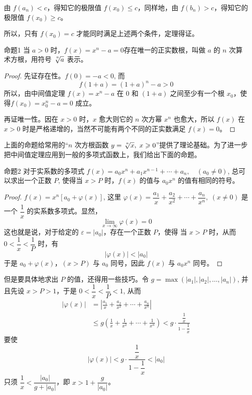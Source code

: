 由 $f(a_n)<c$，得知它的极限值 $f(x_0)\leqslant c$，同样地，由 $f(b_n)>c$，得知它的极限值 $f(x_0)\geqslant c$。

所以，只有 $f(x_0)=c$ 才能同时满足上述两个条件，定理得证。

\begin{Theorem}{命题1}
  当 $a>0$ 时，$f(x)=x^n-a=0$存在唯一的正实数根，叫做 $a$ 的 $n$ 次算术方根，用符号 $\sqrt[\uproot{3}\leftroot{-1}n]{a}$ 表示。
\end{Theorem}

\begin{proof}
先证存在性。$f(0)=-a<0$, 而
\[f(1+a)=(1+a)^n-a>0\]
所以，由中间值定理 $f(x)=x^n-a$ 在 0 和 $(1+a)$ 之间至少有一个根 $x_0$，使得$f(x_0)=x_0^n-a=0$ 成立。

再证唯一性。因在 $x>0$ 时，$x$ 愈大则它的 $n$ 次方幂 $x^n$ 也愈大，所以 $f(x)$ 在 $x>0$ 时是严格递增的，当然不可能有两个不同的正实数满足 $f(x)=0$。
\end{proof}

上面的命题给常用的“$n$ 次方根函数 $y=\sqrt[\uproot{3}\leftroot{-1}n]{x},\; x\geqslant 0$”提供了理论基础。为了进一步把中间值定理应用到一般的多项式函数上，我们给出下面的命题。

\begin{Theorem}{命题2 }
对于实系数的多项式
$f(x)=a_0x^n+a_1x^{n-1}+\cdots+a_n,\quad (a_0\ne 0)$, 总可以求出一个正数 $P$, 使得当 $x>P$ 时，$f(x)$ 的值与 $a_0x^n$ 的值有相同的符号。
\end{Theorem}

\begin{proof}
$f(x)=x^n[a_0+\varphi(x)]$, 这里 $\varphi(x)=\dfrac{a_1}{x}+\dfrac{a_2}{x^2}+\cdots+\dfrac{a_n}{x^n},\; (x\ne 0)$ 是一个 $\dfrac{1}{x}$ 的实系数多项式。显然，
\[\lim_{x\to\infty} \varphi(x)=0\]
这也就是说，对于给定的 $\varepsilon=|a_0|$，存在一个正数 $P$，使得
当 $x>P$ 时，从而 $0<\dfrac{1}{x}<\dfrac{1}{P}$ 时，有
\[|\varphi(x)|<|a_0|\]
于是 $a_0+\varphi(x)$，$(x>P)$ 与 $a_0$ 同号，因此 $f(x)$ 与 $a_0x^n$ 同号。
\end{proof}

但是要具体地求出 $P$ 的值，还得用一些技巧。令 $g=\max(|a_1|,|a_2|,\ldots,|a_n|)$, 并且先设 $x>P>1$，于是 $0<\dfrac{1}{x}<\dfrac{1}{P}<1$, 从而
\[\begin{split}
    |\varphi(x)|&=\left|\frac{a_1}{x}+\frac{a_2}{x^2}+\cdots+\frac{a_n}{x^n}\right|\\
    &\leqslant g\left(\frac{1}{x}+\frac{1}{x^2}+\cdots+\frac{1}{x^n}\right)< g\cdot \frac{\dfrac{1}{x}}{1-\dfrac{1}{x}}
\end{split}\]
要使
\[|\varphi(x)|<g\cdot \frac{\dfrac{1}{x}}{1-\dfrac{1}{x}}<|a_0|\]
只须 $\dfrac{1}{x}<\dfrac{|a_0|}{g+|a_0|}$，即 $x>1+\dfrac{g}{|a_0|}$。

